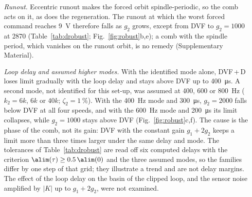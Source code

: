 \emph{Runout.} Eccentric runout makes the forced orbit spindle-periodic, so the comb acts on it, as does the regeneration. The runout at which the worst forced command reaches \SI{9}{\volt} therefore falls as $g_2$ grows, except from DVF to $g_2=1000$ at \SI{2870}{\rpm} (Table~\ref{tab:drobust}; Fig.~\ref{fig:robust}b,e); a comb with the spindle period, which vanishes on the runout orbit, is no remedy (Supplementary Material).

\emph{Loop delay and assumed higher modes.} With the identified mode alone, DVF\,+\,D loses limit gradually with the loop delay and stays above DVF up to \SI{400}{\micro\second}. A second mode, not identified for this set-up, was assumed at 400, 600 or \SI{800}{\hertz} ($k_2=6k$, $6k$ or $40k$; $\zeta_2=\SI{1}{\percent}$). With the \SI{400}{\hertz} mode and \SI{300}{\micro\second}, $g_2=2000$ falls below DVF at all four speeds, and with the \SI{600}{\hertz} mode and \SI{200}{\micro\second} its limit collapses, while $g_2=1000$ stays above DVF (Fig.~\ref{fig:robust}c,f). The cause is the phase of the comb, not its gain: DVF with the constant gain $g_1+2g_2$ keeps a limit more than three times larger under the same delay and mode. The tolerances of Table~\ref{tab:drobust} are read off six computed delays with the criterion $\alim(\tau)\ge0.5\,\alim(0)$ and the three assumed modes, so the families differ by one step of that grid; they illustrate a trend and are not delay margins. The effect of the loop delay on the basin of the clipped loop, and the sensor noise amplified by $\lvert K\rvert$ up to $g_1+2g_2$, were not examined.

